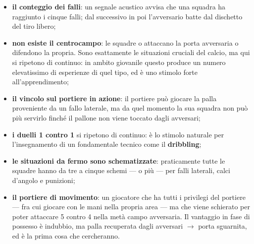 \begin{itemize}
  \item \textbf{il conteggio dei falli}: un segnale acustico avvisa che una squadra ha raggiunto i
    cinque falli; dal successivo in poi l'avversario batte dal dischetto del tiro libero;
  \item \textbf{non esiste il centrocampo}: le squadre o attaccano la porta avversaria o difendono
    la propria. Sono esattamente le situazioni cruciali del calcio, ma qui si ripetono di continuo:
    in ambito giovanile questo produce un numero elevatissimo di esperienze di quel tipo, ed è uno
    stimolo forte all'apprendimento;
  \item \textbf{il vincolo sul portiere in azione}: il portiere può giocare la palla proveniente da
    un fallo laterale, ma da quel momento la sua squadra non può più servirlo finché il pallone non
    viene toccato dagli avversari;
  \item \textbf{i duelli 1 contro 1} si ripetono di continuo: è lo stimolo naturale per
    l'insegnamento di un fondamentale tecnico come il \textbf{dribbling};
  \item \textbf{le situazioni da fermo sono schematizzate}: praticamente tutte le squadre hanno da
    tre a cinque schemi --- o più --- per falli laterali, calci d'angolo e punizioni;
  \item \textbf{il portiere di movimento}: un giocatore che ha tutti i privilegi del portiere ---
    fra cui giocare con le mani nella propria area --- ma che viene schierato per poter attaccare 5
    contro 4 nella metà campo avversaria. Il vantaggio in fase di possesso è indubbio, ma palla
    recuperata dagli avversari $\rightarrow$ porta sguarnita, ed è la prima cosa che cercheranno.
\end{itemize}
